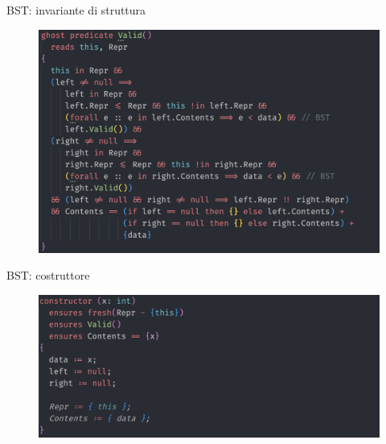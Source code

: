 \documentclass{beamer}
\begin{document}
\begin{frame}{BST: invariante di struttura}
    \begin{figure}
        \includegraphics[scale=0.5]{./assets/images/screenshots/valid.png}
    \end{figure}
\end{frame}

\begin{frame}{BST: costruttore}
    \begin{figure}
        \includegraphics[scale=0.5]{./assets/images/screenshots/cons.png}
    \end{figure}
\end{frame}
\end{document}
